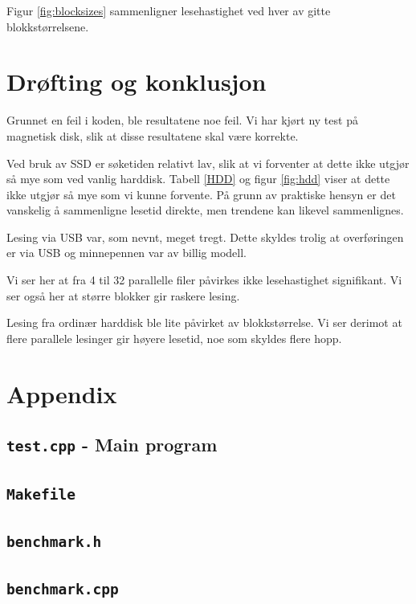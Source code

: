 \documentclass[titlepage]{article}
\begin{document}
Figur \ref{fig:blocksizes} sammenligner lesehastighet ved hver av
gitte blokkstørrelsene.

\section{Drøfting og konklusjon}
Grunnet en feil i koden, ble resultatene noe feil. Vi har kjørt ny test på magnetisk
disk, slik at disse resultatene skal være korrekte.

Ved bruk av SSD er søketiden relativt lav, slik at vi forventer at
dette ikke utgjør så mye som ved vanlig harddisk. Tabell \ref{HDD} og
figur \ref{fig:hdd} viser at dette ikke utgjør så mye som vi kunne
forvente.  På grunn av praktiske hensyn er det vanskelig å sammenligne
lesetid direkte, men trendene kan likevel sammenlignes.

Lesing via USB var, som nevnt, meget tregt.  Dette skyldes trolig at
overføringen er via USB og minnepennen var av billig modell.

Vi ser her at fra 4 til 32 parallelle filer påvirkes ikke
lesehastighet signifikant. Vi ser også her at større blokker gir
raskere lesing.

Lesing fra ordinær harddisk ble lite påvirket av blokkstørrelse. 
Vi ser derimot at flere parallele lesinger gir høyere lesetid, noe som skyldes
flere hopp.



\clearpage
\section{Appendix}

\clearpage
\subsection{\texttt{test.cpp} - Main program}


\subsection{\texttt{Makefile}}


\clearpage
\subsection{\texttt{benchmark.h}}


\clearpage
\subsection{\texttt{benchmark.cpp}}

\end{document}
